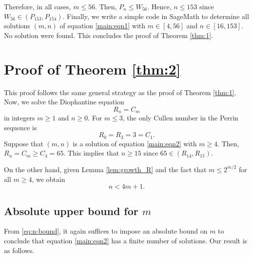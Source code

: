 \documentclass[11pt,a4paper]{article}
\numberwithin{equation}{section}
\numberwithin{table}{section}
\numberwithin{figure}{section}
\begin{document}
Therefore, in all cases, $m \le 56$. Then, $P_{n}\le W_{56}$. Hence, $n\le 153$ since $W_{56}\in (P_{153},P_{154})$. Finally, we write a simple code in SageMath to determine all solutions $(m,n)$ of equation \eqref{main:eqn1} with $m\in [4,56]$ and $n\in [16,153]$. No solution were found. This concludes the proof of Theorem \ref{thm:1}.


\section{Proof of Theorem \ref{thm:2}}

This proof follows the same general strategy as the proof of Theorem \ref{thm:1}. Now, we solve the Diophantine equation
\begin{equation}\label{main:eqn2}
R_n= C_m
\end{equation}
in integers $m\ge 1$ and $n\ge 0$. For $m\le 3$, the only Cullen number in the Perrin sequence is 
$$
R_{0}=R_{3}=3=C_1.
$$ 
Suppose that $(m,n)$ is a solution of equation \eqref{main:eqn2} with $m\ge 4$. Then, $R_n=C_{m}\ge C_{4}=65$. This implies that $n\ge 15$ since $65\in (R_{14},R_{15})$. 

On the other hand, given Lemma \ref{lem:growth_R} and the fact that $m\le 2^{m/2}$ for all $m\ge 4$, we obtain
\begin{equation}\label{eq:n-bound}
n<4m+1.
\end{equation}

\subsection{Absolute upper bound for $m$}
From \eqref{eq:n-bound}, it again suffices to impose an absolute bound on $m$ to conclude that equation \eqref{main:eqn2} has a finite number of solutions. Our result is as follows.
\end{document}

